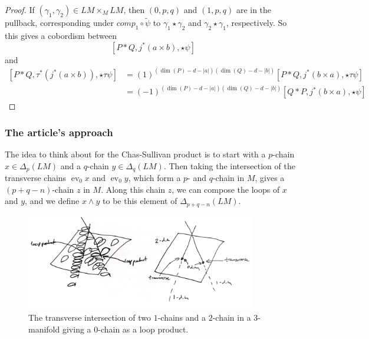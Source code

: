 \documentclass[reqno]{amsart}
\theoremstyle{definition}
\theoremstyle{remark}
\DeclareMathOperator{\ev}{ev}
\begin{document}
\begin{proof}
    If $\left( \gamma_1, \gamma_2 \right) \in 
    LM \times_M LM$, then
    $\left( 0,p,q \right)$ and
    $ \left( 1, p,q \right) $ are in the pullback,
    corresponding under 
    $comp_1 \circ \tilde{\psi} $ to
    $\gamma_1 \star \gamma_2$ and $ \gamma_2 \star \gamma_1$, respectively.
    So this gives a cobordism between
    \[
    \left[ P * Q, j^{*}(a \times b), \star \psi \right]
    \] 
    and
    \begin{align*}
    \left[ P * Q, \tau^{*}\left( j^{*}(a \times b) \right) ,
    \star \tau \psi\right] 
    &= (1)^{\left( \dim(P) - d - \left| a \right|  \right) 
    \left( \dim (Q) - d - \left| b \right|  \right) } 
    \left[ P * Q , j^{*}(b \times a), \star \tau \psi \right] \\
    &=
    (-1)^{\left( \dim(P) - d- \left| a \right| \right)
    \left( \dim (Q) - d- \left| b \right|  \right) }
    \left[ Q* P, j^{*}(b \times a), \star \psi \right] 
    \end{align*}
    
\end{proof}



    






\subsubsection{The article's approach}


The idea to think about for the Chas-Sullivan product is to
start with a $p$-chain $x \in \Delta_p (LM)$ and a 
$q$-chain $y \in \Delta_q (LM)$.
Then taking the intersection of the transverse chains
$\ev_0 x$ and $\ev_0 y$, which form a $p$- and $q$-chain in $M$,
gives a $(p+q-n)$-chain $z$ in $M$.
Along this chain $z$, we can compose the loops of $x$ and $y$, and
we define $x \wedge y$ to be this element of
$\Delta_{p+q-n}(LM)$.


\begin{figure}[htpb]
    \centering
    \includegraphics[width=0.9\textwidth]{Figures/DNOVXJ.jpeg}
    \caption{The transverse intersection of two $1$-chains and
    a $2$-chain in a $3$-manifold giving a $0$-chain as a 
loop product. \cite[From Figure 2]{Chas-Sullivan}}
    \label{fig:Figures-DNOVXJ-jpeg}
\end{figure}
\end{document}
